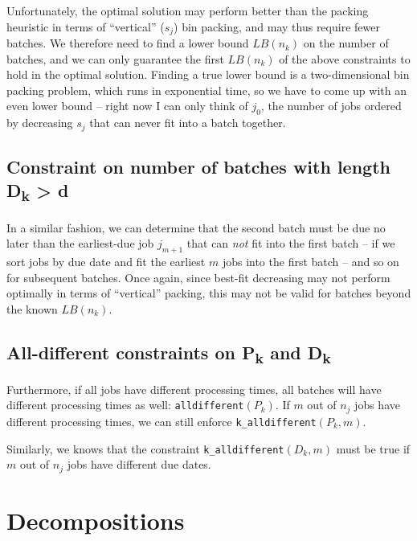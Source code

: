 Unfortunately, the optimal solution may perform better than the packing heuristic in
terms of ``vertical'' ($s_j$) bin packing, and may thus require fewer batches.
We therefore need to find a lower bound $LB(n_k)$ on the number of batches, and
we can only guarantee the first $LB(n_k)$ of the above constraints to hold in
the optimal solution. Finding a true lower bound is a two-dimensional bin
packing problem, which runs in exponential time, so we
have to come up with an even lower bound -- right now I can only think of $j_0$,
the number of jobs ordered by decreasing $s_j$ that can never fit into a batch
together.

\subsection[Constraint on the number of batches with due date $D_k >
d$]{Constraint on number of batches with length {\sansitalicfont
D\textsubscript{k}} > {\sansitalicfont d}}

In a similar fashion, we can determine that the second batch must be due no
later than the earliest-due job $j_{m+1}$ that can \textit{not} fit into the first
batch -- if we sort jobs by due date and fit the earliest $m$ jobs into the first
batch -- and so on for subsequent batches. Once again, since best-fit decreasing
may not perform optimally in terms of ``vertical'' packing, this may not be
valid for batches beyond the known $LB(n_k)$.

\subsection[All-different constraints on $P_k$ and $D_k$]{All-different
constraints on {\sansitalicfont P\textsubscript{k}} and {\sansitalicfont
D\textsubscript{k}}}

Furthermore, if all jobs have different processing times, all batches will have different
processing times as well: \texttt{alldifferent}$(P_k)$. If $m$ out of $n_j$ jobs
have different processing times, we can still enforce
\texttt{k\_alldifferent}$(P_k, m)$. 

Similarly, we knows that the constraint \texttt{k\_alldifferent}$(D_k, m)$ must
be true if $m$ out of $n_j$ jobs have different due dates.

\section{Decompositions}
